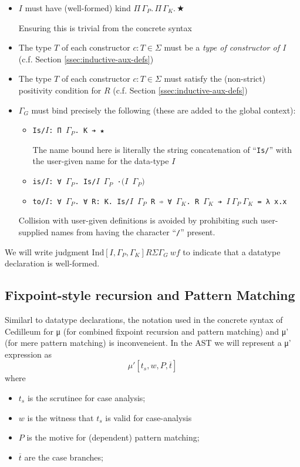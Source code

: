 \documentclass{article}
\newcommand{\ann}[2]{#1\! : \! #2}
\newcommand{\absu}[3]{{#1}\, #2.\, #3}
\newcommand{\indsche}[3]{\ensuremath{\text{Ind}[#1,#2,#3]}}
\newcommand{\mupsche}[4]{μ'[#1,#2,#3,#4]}
\newcommand{\vars}[1]{{\overline{#1}}}
\begin{document}
\begin{itemize}
\item $I$ must have (well-formed) kind $\absu{\Pi}{\Gamma_P}{\absu{\Pi}{\Gamma_K}{★}}$

  Ensuring this is trivial from the concrete syntax
\item The type $T$ of each constructor $\ann{c}{T} \in \Sigma$ must be a \textit{type of
    constructor of I} (c.f. Section \ref{ssec:inductive-aux-defs})
\item The type $T$ of each constructor $\ann{c}{T} \in \Sigma$ must satisfy the (non-strict)
  positivity condition for $R$ (c.f. Section \ref{ssec:inductive-aux-defs})
\item $\Gamma_G$ must bind precisely the following (these are added to the
  global context):
  \begin{itemize}
  \item \texttt{Is/$I$: Π $\Gamma_P$. K ➔ ★}

    The name bound here is literally the string concatenation of
    ``\texttt{Is/}'' with the user-given name for the data-type $I$
  \item \texttt{is/$I$: ∀ $\Gamma_P$. Is/$I$ $\Gamma_P$ ·$(I$ $\Gamma_P)$}
  \item \texttt{to/$I$: ∀ $\Gamma_P$. ∀ R: K. Is/$I$ $\Gamma_P$ R ➾ ∀
      $\Gamma_K$. R $\Gamma_K$ ➔ $I\ \Gamma_P\ \Gamma_K$ = λ x.x}
  \end{itemize}

  Collision with user-given definitions is avoided by prohibiting such
  user-supplied names from having the character ``\texttt{/}'' present.
\end{itemize}

We will write judgment $\indsche{I}{\Gamma_P}{\Gamma_K}{R}{\Sigma}{\Gamma_G}\ wf$
to indicate that a datatype declaration is well-formed.

\subsection{Fixpoint-style recursion and Pattern Matching}
Similarl to datatype declarations, the notation used in the concrete syntax of
Cedilleum for μ (for combined fixpoint recursion and pattern matching) and μ'
(for mere pattern matching) is inconveneient. In the AST we will represent a μ'
expression as
\[
  \mupsche{t_s}{w}{P}{\vars{t}}
\]
\noindent where
\begin{itemize}
\item $t_s$ is the scrutinee for case analysis;
\item $w$ is the witness that $t_s$ is valid for case-analysis
\item $P$ is the motive for (dependent) pattern matching;
\item $\vars{t}$ are the case branches;
\end{itemize}
\end{document}
